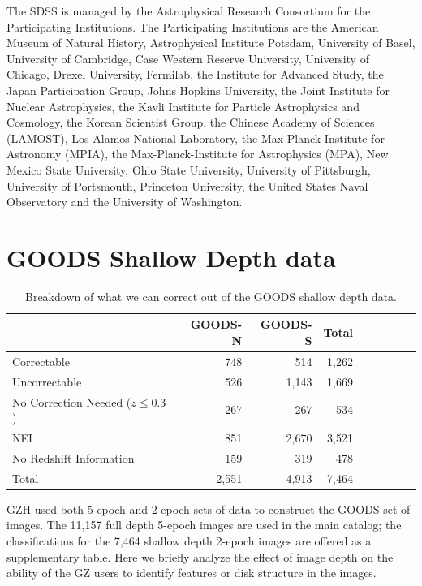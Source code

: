 \documentclass[twocolumn]{aastex6}
\begin{document}
The SDSS is managed by the Astrophysical Research Consortium for the Participating Institutions. The Participating Institutions are the American Museum of Natural History, Astrophysical Institute Potsdam, University of Basel, University of Cambridge, Case Western Reserve University, University of Chicago, Drexel University, Fermilab, the Institute for Advanced Study, the Japan Participation Group, Johns Hopkins University, the Joint Institute for Nuclear Astrophysics, the Kavli Institute for Particle Astrophysics and Cosmology, the Korean Scientist Group, the Chinese Academy of Sciences (LAMOST), Los Alamos National Laboratory, the Max-Planck-Institute for Astronomy (MPIA), the Max-Planck-Institute for Astrophysics (MPA), New Mexico State University, Ohio State University, University of Pittsburgh, University of Portsmouth, Princeton University, the United States Naval Observatory and the University of Washington. 



\newpage
\clearpage
\appendix
\section{GOODS Shallow Depth data}


\begin{table}
\caption{Breakdown of what we can correct out of the GOODS shallow depth data. \label{tbl:goods_shallow_categories}}
\begin{tabular}{lrrrrrrrr}
\hline\hline
                                   & GOODS-N & GOODS-S & Total \\
\hline
Correctable                        & 748     & 514     & 1,262 \\
Uncorrectable                      & 526     & 1,143   & 1,669 \\
No Correction Needed ($z \le 0.3$) & 267     & 267     & 534   \\ 
NEI                                & 851     & 2,670   & 3,521 \\
No Redshift Information            & 159     & 319     & 478   \\
Total                              & 2,551   & 4,913   & 7,464 \\
\hline\hline
\end{tabular}
\end{table}



GZH used both 5-epoch and 2-epoch sets of data to construct the GOODS set of images. The 11,157 full depth 5-epoch images are used in the main catalog; the classifications for the 7,464 shallow depth 2-epoch images are offered as a supplementary table. Here we briefly analyze the effect of image depth on the ability of the GZ users to identify features or disk structure in the images. 
\end{document}
